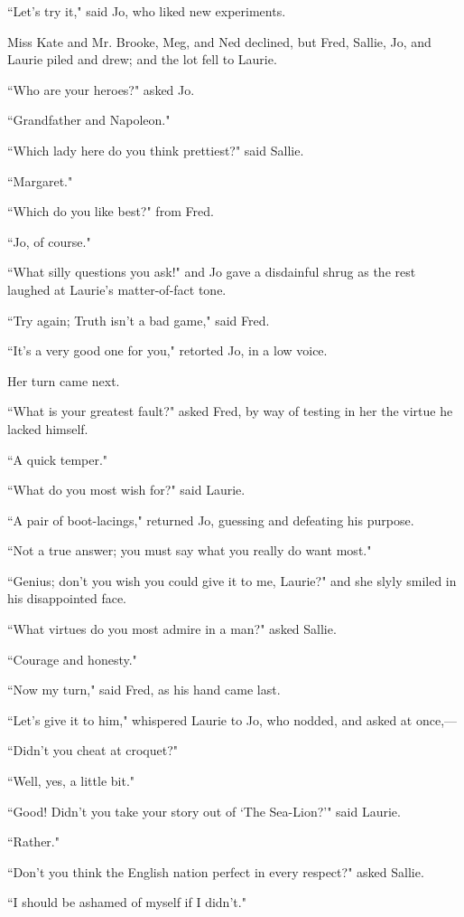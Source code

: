 ``Let's try it," said Jo, who liked new experiments.

Miss Kate and Mr. Brooke, Meg, and Ned declined, but Fred, Sallie, Jo,
and Laurie piled and drew; and the lot fell to Laurie.

``Who are your heroes?" asked Jo.

``Grandfather and Napoleon."

``Which lady here do you think prettiest?" said Sallie.

``Margaret."

``Which do you like best?" from Fred.

``Jo, of course."

``What silly questions you ask!" and Jo gave a disdainful shrug as the
rest laughed at Laurie's matter-of-fact tone.

``Try again; Truth isn't a bad game," said Fred.

``It's a very good one for you," retorted Jo, in a low
voice.

Her turn came next.

``What is your greatest fault?" asked Fred, by way of testing in her the
virtue he lacked himself.

``A quick temper."

``What do you most wish for?" said Laurie.

``A pair of boot-lacings," returned Jo, guessing and defeating his
purpose.

``Not a true answer; you must say what you really do want most."

``Genius; don't you wish you could give it to me,
Laurie?" and she slyly smiled in his disappointed face.

``What virtues do you most admire in a man?" asked Sallie.

``Courage and honesty."

``Now my turn," said Fred, as his hand came last.

``Let's give it to him," whispered Laurie to Jo, who
nodded, and asked at once,---

``Didn't you cheat at croquet?"

``Well, yes, a little bit."

``Good! Didn't you take your story out of
`The Sea-Lion?'" said Laurie.

``Rather."

``Don't you think the English nation perfect in every
respect?" asked Sallie.

``I should be ashamed of myself if I didn't."

